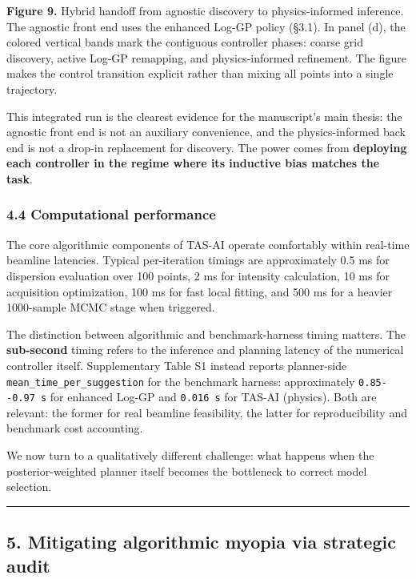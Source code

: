 \documentclass[
]{article}
\begin{document}
\textbf{Figure 9.} Hybrid handoff from agnostic discovery to
physics-informed inference. The agnostic front end uses the enhanced
Log-GP policy (§3.1). In panel (d), the colored vertical bands mark the
contiguous controller phases: coarse grid discovery, active Log-GP
remapping, and physics-informed refinement. The figure makes the control
transition explicit rather than mixing all points into a single
trajectory.

This integrated run is the clearest evidence for the manuscript's main
thesis: the agnostic front end is not an auxiliary convenience, and the
physics-informed back end is not a drop-in replacement for discovery.
The power comes from \textbf{deploying each controller in the regime
where its inductive bias matches the task}.

\hypertarget{computational-performance}{%
\subsubsection{4.4 Computational
performance}\label{computational-performance}}

The core algorithmic components of TAS-AI operate comfortably within
real-time beamline latencies. Typical per-iteration timings are
approximately 0.5 ms for dispersion evaluation over 100 points, 2 ms for
intensity calculation, 10 ms for acquisition optimization, 100 ms for
fast local fitting, and 500 ms for a heavier 1000-sample MCMC stage when
triggered.

The distinction between algorithmic and benchmark-harness timing
matters. The \textbf{sub-second} timing refers to the inference and
planning latency of the numerical controller itself. Supplementary Table
S1 instead reports planner-side \texttt{mean\_time\_per\_suggestion} for
the benchmark harness: approximately \texttt{0.85-\/-0.97\ s} for
enhanced Log-GP and \texttt{0.016\ s} for TAS-AI (physics). Both are
relevant: the former for real beamline feasibility, the latter for
reproducibility and benchmark cost accounting.

We now turn to a qualitatively different challenge: what happens when
the posterior-weighted planner itself becomes the bottleneck to correct
model selection.

\begin{center}\rule{0.5\linewidth}{0.5pt}\end{center}

\hypertarget{mitigating-algorithmic-myopia-via-strategic-audit}{%
\subsection{5. Mitigating algorithmic myopia via strategic
audit}\label{mitigating-algorithmic-myopia-via-strategic-audit}}
\end{document}
